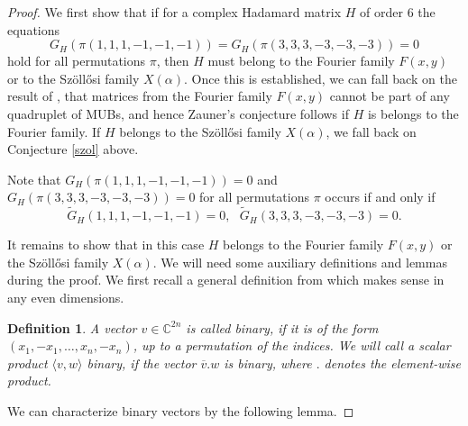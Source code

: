 \documentclass[12pt]{amsart}
\numberwithin{equation}{section}
\newcommand{\stb}{,\ldots,}
\newcommand{\bra}{\langle}
\newcommand{\ket}{\rangle}
\newcommand*\conj[1]{\overline{#1}}
\newcommand{\C}{\mathbb{C}}
\newtheorem{defi}[fact]{Definition}
\newenvironment{definition}{\begin{defi} \rm}{\end{defi}}
\theoremstyle{definition}
\theoremstyle{remark}
\theoremstyle{remark}
\def \C {\mathbb{C}}
\begin{document}
\begin{proof}
We first show that 
if for a complex Hadamard matrix $H$ of order 6 the equations 
\begin{equation}\label{13}
G_{H}(\pi(1,1,1,-1,-1,-1))=G_{H}(\pi(3,3,3,-3,-3,-3))=0
\end{equation}
hold for all permutations $\pi$, then $H$ must belong to the Fourier family $F(x,y)$ or to the Sz\"oll\H osi family $X(\alpha)$. Once this is established, we can fall back on the result of \cite{arxiv}, that matrices from the Fourier family $F(x,y)$  cannot be part of any quadruplet of MUBs, and hence Zauner's conjecture follows if $H$ is belongs to the Fourier family. If $H$  belongs to the Sz\"oll\H osi family $X(\alpha)$, we fall back on Conjecture \ref{szol} above.


\medskip

Note that
$G_{H}(\pi(1,1,1,-1,-1,-1))=0$ and $G_{H}(\pi(3,3,3,-3,-3,-3))=0$ for all permutations $\pi$ occurs if and only if 
\begin{equation}\label{Gbar0}
\tilde{G}_H(1,1,1,-1,-1,-1)=0, \ \ \ \tilde{G}_H(3,3,3,-3,-3, -3)=0.
\end{equation}

It remains to show that in this case $H$ belongs to the Fourier family $F(x,y)$ or the Sz\"oll\H osi family $X(\alpha)$. We will need some auxiliary definitions and lemmas during the proof. We first recall a general definition from \cite{BBS} which makes sense in any even dimensions.

\medskip

\begin{definition}\label{def:cancellation}
	A vector $v\in \C^{2n}$ is called \emph{binary}, if it is of the form $(x_1,-x_1\stb x_n,-x_n)$, up to a permutation of the indices. We will call a scalar product $\bra v,w\ket$ \emph{binary}, if the vector $\conj{v}.w$ is binary, where $.$ denotes the element-wise product.
\end{definition}	


We can characterize binary vectors by the following lemma. 

\medskip


\end{proof}
\end{document}
